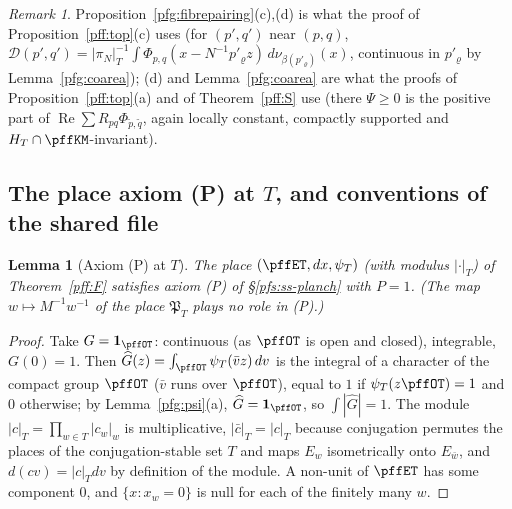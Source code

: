 \documentclass[10pt]{amsart}
\newtheorem{lemma}[theorem]{Lemma}
\theoremstyle{definition}
\theoremstyle{remark}
\newtheorem{remark}[theorem]{Remark}
\newcommand{\Rel}{\operatorname{Re}}
\begin{document}
\begin{remark}\label{pfg:rem-top}
Proposition~\ref{pfg:fibrepairing}(c),(d) is what the proof of Proposition~\ref{pff:top}(c) uses (for $(p',q')$ near $(p,q)$,
$\mathcal D(p',q')=|\pi_N|_T^{-1}\int\Phi_{p,q}(x-N^{-1}p'_\varrho z)\,d\nu_{\beta(p'_\varrho)}(x)$, continuous in $p'_\varrho$ by
Lemma~\ref{pfg:coarea}); (d) and Lemma~\ref{pfg:coarea} are what the proofs of Proposition~\ref{pff:top}(a) and of
Theorem~\ref{pff:S} use (there $\Psi\ge0$ is the positive part of $\Rel\sum R_{pq}\Phi_{\tilde p,\tilde q}$, again locally
constant, compactly supported and $H_T\cap\pffKM$-invariant).
\end{remark}

\subsection{The place axiom (P) at $T$, and conventions of the shared file}\label{pfg:ss-P}

\begin{lemma}[Axiom (P) at $T$]\label{pfg:P}
The place $(\pffET,dx,\psi_T)$ (with modulus $|\cdot|_T$) of Theorem~\ref{pff:F} satisfies axiom (P) of
\S\ref{pfs:ss-planch} with $P=1$. (The map $w\mapsto M^{-1}w^{-1}$ of the place $\mathfrak P_T$ plays no role in (P).)
\end{lemma}
\begin{proof}
Take $G=\mathbf 1_{\pffOT}$: continuous (as $\pffOT$ is open and closed), integrable, $G(0)=1$. Then
$\widehat G(z)=\int_{\pffOT}\psi_T(\bar vz)\,dv$ is the integral of a character of the compact group $\pffOT$
($\bar v$ runs over $\pffOT$), equal to $1$ if $\psi_T(z\pffOT)=1$ and $0$ otherwise; by Lemma~\ref{pfg:psi}(a),
$\widehat G=\mathbf 1_{\pffOT}$, so $\int|\widehat G|=1$. The module $|c|_T=\prod_{w\in T}|c_w|_w$ is multiplicative,
$|\bar c|_T=|c|_T$ because conjugation permutes the places of the conjugation-stable set $T$ and maps $E_w$
isometrically onto $E_{\bar w}$, and $d(cv)=|c|_Tdv$ by definition of the module. A non-unit of $\pffET$ has some
component $0$, and $\{x:x_w=0\}$ is null for each of the finitely many $w$.
\end{proof}
\end{document}
